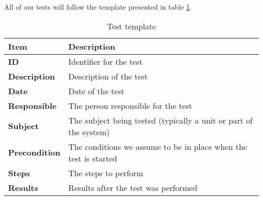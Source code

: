 All of our tests will follow the template presented in table \ref{tab:testtable}.
\begin{table}
	\begin{center}
		\begin{tabular}{|p{4.0cm}|p{8.0cm}|}
			\hline
			\bf{Item} & \bf{Description}\\
			\hline
			\bf{ID} & Identifier for the test\\
			\bf{Description} & Description of the test\\
			\bf{Date} & Date of the test\\
			\bf{Responsible} & The person responsible for the test\\
			\bf{Subject} & The subject being tested (typically a unit or part of the system)\\
			\bf{Precondition} & The conditions we assume to be in place when the test is started\\
			\bf{Steps} & The steps to perform\\
			\hline
			\bf{Results} & Results after the test was performed\\
			\hline
		\end{tabular}
	\end{center}
	\caption{Test template}
	\label{tab:testtable}
\end{table}

